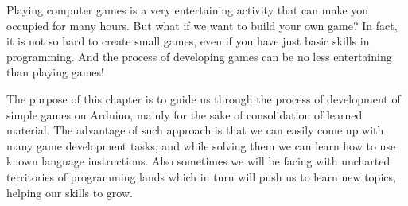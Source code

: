 \documentclass[../sparc.tex]{subfiles}
\begin{document}
Playing computer games is a very entertaining activity that can make you
occupied for many hours.  But what if we want to build your own game?  In fact,
it is not so hard to create small games, even if you have just basic skills in
programming.  And the process of developing games can be no less entertaining
than playing games!

The purpose of this chapter is to guide us through the process of development of
simple games on Arduino, mainly for the sake of consolidation of learned
material.  The advantage of such approach is that we can easily come up with
many game development tasks, and while solving them we can learn how to use
known language instructions.  Also sometimes we will be facing with uncharted
territories of programming lands which in turn will push us to learn new topics,
helping our skills to grow.
\end{document}

